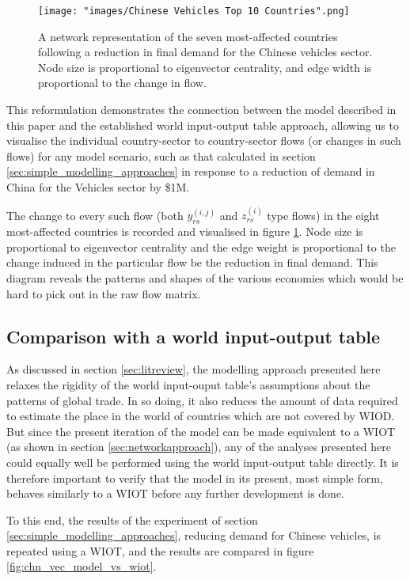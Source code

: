 \documentclass[a4paper]{article}
\begin{document}
\begin{figure}[tb]
\centering
\texttt{[image: "images/Chinese Vehicles Top 10 Countries".png]}
\caption{A network representation of the seven most-affected countries following a reduction in final demand for the Chinese vehicles sector. Node size is proportional to eigenvector centrality, and edge width is proportional to the change in flow.}\label{fig:chnvehtop6}
\end{figure}

This reformulation demonstrates the connection between the model described in this paper and the established world input-output table approach, allowing us to visualise the individual country-sector to country-sector flows (or changes in such flows) for any model scenario, such as that calculated in section \ref{sec:simple_modelling_approaches} in response to a reduction of demand in China for the Vehicles sector by \$1M.

The change to every such flow (both $y_{rs}^{(i,j)}$ and $z_{rs}^{(i)}$ type flows) in the eight most-affected countries is recorded and visualised in figure \ref{fig:chnvehtop6}.
Node size is proportional to eigenvector centrality and the edge weight is proportional to the change induced in the particular flow be the reduction in final demand.
This diagram reveals the patterns and shapes of the various economies which would be hard to pick out in the raw flow matrix.

\subsection{Comparison with a world input-output table}
As discussed in section \ref{sec:litreview}, the modelling approach presented here relaxes the rigidity of the world input-ouput table's assumptions about the patterns of global trade.
In so doing, it also reduces the amount of data required to estimate the place in the world of countries which are not covered by WIOD.
But since the present iteration of the model can be made equivalent to a WIOT (as shown in section \ref{sec:networkapproach}), any of the analyses presented here could equally well be performed using the world input-output table directly.
It is therefore important to verify that the model in its present, most simple form, behaves similarly to a WIOT before any further development is done.

To this end, the results of the experiment of section \ref{sec:simple_modelling_approaches}, reducing demand for Chinese vehicles, is repeated using a WIOT, and the results are compared in figure \ref{fig:chn_vec_model_vs_wiot}.
\end{document}
